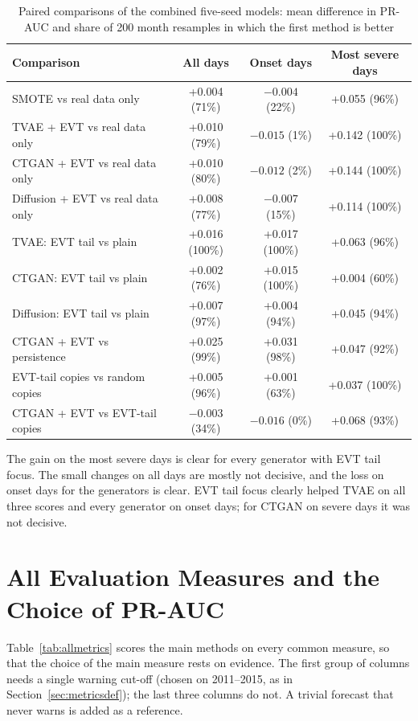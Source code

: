\documentclass[12pt,a4paper]{report}
\begin{document}
\begin{table}[H]
\centering
\caption{Paired comparisons of the combined five-seed models: mean difference in PR-AUC and share of 200 month
resamples in which the first method is better}
\label{tab:paired}
\footnotesize
\begin{tabular}{|l|c|c|c|}
\hline
\textbf{Comparison} & \textbf{All days} & \textbf{Onset days} & \textbf{Most severe days}\\ \hline
SMOTE vs real data only & +0.004 (71\%) & $-0.004$ (22\%) & +0.055 (96\%)\\ \hline
TVAE + EVT vs real data only & +0.010 (79\%) & $-0.015$ (1\%) & +0.142 (100\%)\\ \hline
CTGAN + EVT vs real data only & +0.010 (80\%) & $-0.012$ (2\%) & +0.144 (100\%)\\ \hline
Diffusion + EVT vs real data only & +0.008 (77\%) & $-0.007$ (15\%) & +0.114 (100\%)\\ \hline
TVAE: EVT tail vs plain & +0.016 (100\%) & +0.017 (100\%) & +0.063 (96\%)\\ \hline
CTGAN: EVT tail vs plain & +0.002 (76\%) & +0.015 (100\%) & +0.004 (60\%)\\ \hline
Diffusion: EVT tail vs plain & +0.007 (97\%) & +0.004 (94\%) & +0.045 (94\%)\\ \hline
CTGAN + EVT vs persistence & +0.025 (99\%) & +0.031 (98\%) & +0.047 (92\%)\\ \hline
EVT-tail copies vs random copies & +0.005 (96\%) & +0.001 (63\%) & +0.037 (100\%)\\ \hline
CTGAN + EVT vs EVT-tail copies & $-0.003$ (34\%) & $-0.016$ (0\%) & +0.068 (93\%)\\ \hline
\end{tabular}
\end{table}

The gain on the most severe days is clear for every generator with EVT tail focus. The small changes on all days are
mostly not decisive, and the loss on onset days for the generators is clear. EVT tail focus clearly helped TVAE on
all three scores and every generator on onset days; for CTGAN on severe days it was not decisive.

\section{All Evaluation Measures and the Choice of PR-AUC}
\label{sec:allmetrics}
Table~\ref{tab:allmetrics} scores the main methods on every common measure, so that the choice of the main measure
rests on evidence. The first group of columns needs a single warning cut-off (chosen on 2011--2015, as in
Section~\ref{sec:metricsdef}); the last three columns do not. A trivial forecast that never warns is added as a
reference.
\end{document}
